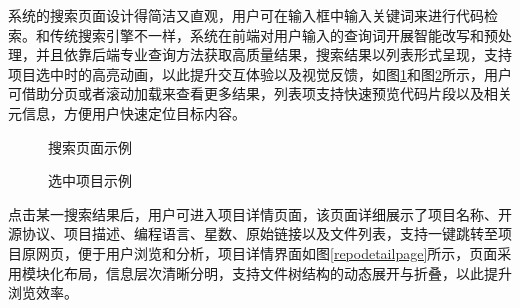 \documentclass[UTF8,a4paper,12pt]{ctexart}
\numberwithin{equation}{section}
\begin{document}
系统的搜索页面设计得简洁又直观，用户可在输入框中输入关键词来进行代码检索。和传统搜索引擎不一样，系统在前端对用户输入的查询词开展智能改写和预处理，并且依靠后端专业查询方法获取高质量结果，搜索结果以列表形式呈现，支持项目选中时的高亮动画，以此提升交互体验以及视觉反馈，如图\ref{searchpage}和图\ref{select}所示，用户可借助分页或者滚动加载来查看更多结果，列表项支持快速预览代码片段以及相关元信息，方便用户快速定位目标内容。
\begin{figure}[H]
	\caption{搜索页面示例}
	\label{searchpage}
\end{figure}
\begin{figure}[H]
	\caption{选中项目示例}
	\label{select}
\end{figure}
点击某一搜索结果后，用户可进入项目详情页面，该页面详细展示了项目名称、开源协议、项目描述、编程语言、星数、原始链接以及文件列表，支持一键跳转至项目原网页，便于用户浏览和分析，项目详情界面如图\ref{repodetailpage}所示，页面采用模块化布局，信息层次清晰分明，支持文件树结构的动态展开与折叠，以此提升浏览效率。
\end{document}
